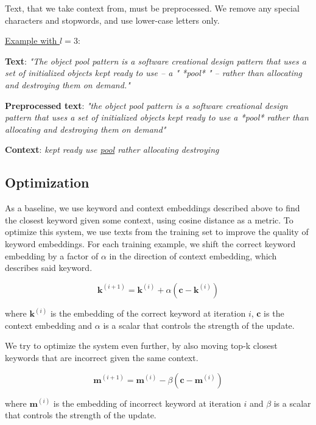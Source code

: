 \documentclass{llncs}
\begin{document}
Text, that we take context from, must be preprocessed.
We remove any special characters and stopwords, and use lower-case letters only.

\underline{Example with \(l=3\)}:

\textbf{Text}:
\textit{"The object pool pattern is a software creational design pattern that uses a set of initialized objects kept ready to use – a " *pool* " – rather than allocating and destroying them on demand."}

\textbf{Preprocessed text}:
\textit{"the object pool pattern is a software creational design pattern that uses a set of initialized objects kept ready to use a *pool* rather than allocating and destroying them on demand"}

\textbf{Context}:
\textit{kept ready use \underline{pool} rather allocating destroying}

\subsection{Optimization}
\label{sec:optimization}
As a baseline, we use keyword and context embeddings described above to find the closest keyword given some context, using cosine distance as a metric.
To optimize this system, we use texts from the training set to improve the quality of keyword embeddings.
For each training example, we shift the correct keyword embedding by a factor of \(\alpha\) in the direction of context embedding, which describes said keyword.

\begin{equation}
    \label{eq:alpha_optimization}
    \bm{k}^{(i+1)} = \bm{k}^{(i)} + \alpha(\bm{c} - \bm{k}^{(i)})
\end{equation}

where \(\bm{k}^{(i)}\) is the embedding of the correct keyword at iteration \(i\), \(\bm{c}\) is the context embedding and \(\alpha\) is a scalar that controls the strength of the update.

\smallskip
We try to optimize the system even further, by also moving top-k closest keywords that are incorrect given the same context.

\begin{equation}
    \label{eq:beta_optimization}
    \bm{m}^{(i+1)} = \bm{m}^{(i)} - \beta(\bm{c} - \bm{m}^{(i)})
\end{equation}

where \(\bm{m}^{(i)}\) is the embedding of incorrect keyword at iteration \(i\) and \(\beta\) is a scalar that controls the strength of the update.
\end{document}
